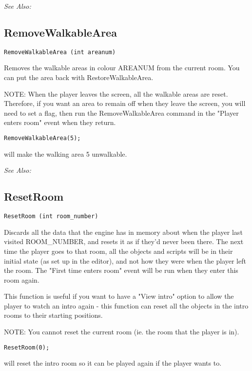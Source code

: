 \it{See Also:} 


\subsection{RemoveWalkableArea}\label{RemoveWalkableArea}%

\begin{verbatim}
RemoveWalkableArea (int areanum)
\end{verbatim}
Removes the walkable areas in colour AREANUM from the current room. You can
put the area back with RestoreWalkableArea.

NOTE: When the player leaves the screen, all the walkable areas are reset.
Therefore, if you want an area to remain off when they leave the screen,
you will need to set a flag, then run the RemoveWalkableArea command in
the "Player enters room" event when they return.

\begin{verbatim}
RemoveWalkableArea(5);
\end{verbatim}
will make the walking area 5 unwalkable.

\it{See Also:} 


\subsection{ResetRoom}\label{ResetRoom}%

\begin{verbatim}
ResetRoom (int room_number)
\end{verbatim}
Discards all the data that the engine has in memory about when the player
last visited ROOM_NUMBER, and resets it as if they'd never been there. The
next time the player goes to that room, all the objects and scripts will
be in their initial state (as set up in the editor), and not how they were
when the player left the room. The "First time enters room" event will be
run when they enter this room again.

This function is useful if you want to have a "View intro" option to allow
the player to watch an intro again - this function can reset all the
objects in the intro rooms to their starting positions.

NOTE: You cannot reset the current room (ie. the room that the player is in).

\begin{verbatim}
ResetRoom(0);
\end{verbatim}
will reset the intro room so it can be played again if the player wants to.


